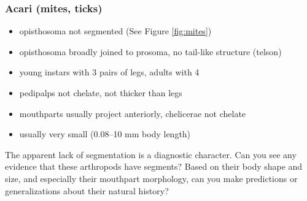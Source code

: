 \documentclass[letterpaper, 11pt]{article}
\begin{document}
\subsubsection*{Acari (mites, ticks)}
\begin{itemize}
\item opisthosoma not segmented (See Figure \ref{fig:mites})
\item opisthosoma broadly joined to prosoma, no tail-like structure (telson)
\item young instars with 3 pairs of legs, adults with 4
\item pedipalps not chelate, not thicker than legs
\item mouthparts usually project anteriorly, chelicerae not chelate
\item usually very small (0.08--10 mm body length)
\end{itemize}
The apparent lack of segmentation is a diagnostic character. Can you see any evidence that these arthropods have segments? Based on their body shape and size, and especially their mouthpart morphology, can you make predictions or generalizations about their natural history?\vspace{5cm}
\end{document}
